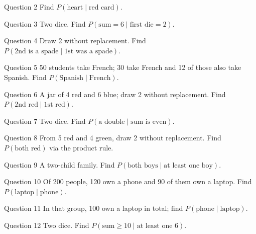 \documentclass[11pt]{article}
\begin{document}
\begin{qbox}{Question 2}
Find $P(\text{heart}\mid\text{red card})$.\workspace{2.4cm}
\end{qbox}

\begin{qbox}{Question 3}
Two dice. Find $P(\text{sum}=6\mid\text{first die}=2)$.\workspace{2.4cm}
\end{qbox}

\begin{qbox}{Question 4}
Draw 2 without replacement. Find $P(\text{2nd is a spade}\mid\text{1st was a spade})$.\workspace{2.4cm}
\end{qbox}

\begin{qbox}{Question 5}
50 students take French; 30 take French and 12 of those also take Spanish. Find $P(\text{Spanish}\mid\text{French})$.\workspace{2.4cm}
\end{qbox}

\begin{qbox}{Question 6}
A jar of 4 red and 6 blue; draw 2 without replacement. Find $P(\text{2nd red}\mid\text{1st red})$.\workspace{2.4cm}
\end{qbox}

\begin{qbox}{Question 7}
Two dice. Find $P(\text{a double}\mid\text{sum is even})$.\workspace{2.4cm}
\end{qbox}

\begin{qbox}{Question 8}
From 5 red and 4 green, draw 2 without replacement. Find $P(\text{both red})$ via the product rule.\workspace{2.4cm}
\end{qbox}

\begin{qbox}{Question 9}
A two-child family. Find $P(\text{both boys}\mid\text{at least one boy})$.\workspace{2.4cm}
\end{qbox}

\begin{qbox}{Question 10}
Of 200 people, 120 own a phone and 90 of them own a laptop. Find $P(\text{laptop}\mid\text{phone})$.\workspace{2.4cm}
\end{qbox}

\begin{qbox}{Question 11}
In that group, 100 own a laptop in total; find $P(\text{phone}\mid\text{laptop})$.\workspace{2.4cm}
\end{qbox}

\begin{qbox}{Question 12}
Two dice. Find $P(\text{sum}\ge10\mid\text{at least one 6})$.\workspace{2.4cm}
\end{qbox}
\end{document}
